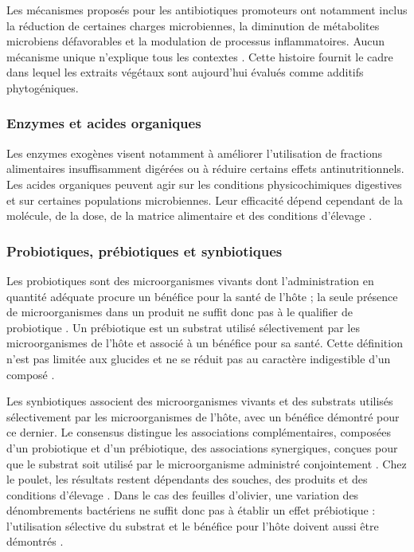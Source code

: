 Les mécanismes proposés pour les antibiotiques promoteurs ont notamment inclus la réduction de certaines charges microbiennes, la diminution de métabolites microbiens défavorables et la modulation de processus inflammatoires. Aucun mécanisme unique n'explique tous les contextes \citep{Gadde2017}. Cette histoire fournit le cadre dans lequel les extraits végétaux sont aujourd'hui évalués comme additifs phytogéniques.

\subsubsection{Enzymes et acides organiques}

Les enzymes exogènes visent notamment à améliorer l'utilisation de fractions alimentaires insuffisamment digérées ou à réduire certains effets antinutritionnels. Les acides organiques peuvent agir sur les conditions physicochimiques digestives et sur certaines populations microbiennes. Leur efficacité dépend cependant de la molécule, de la dose, de la matrice alimentaire et des conditions d'élevage \citep{Gadde2017}.

\subsubsection{Probiotiques, prébiotiques et synbiotiques}

Les probiotiques sont des microorganismes vivants dont l'administration en quantité adéquate procure un bénéfice pour la santé de l'hôte ; la seule présence de microorganismes dans un produit ne suffit donc pas à le qualifier de probiotique \citep{Hill2014}. Un prébiotique est un substrat utilisé sélectivement par les microorganismes de l'hôte et associé à un bénéfice pour sa santé. Cette définition n'est pas limitée aux glucides et ne se réduit pas au caractère indigestible d'un composé \citep{Gibson2017}.

Les synbiotiques associent des microorganismes vivants et des substrats utilisés sélectivement par les microorganismes de l'hôte, avec un bénéfice démontré pour ce dernier. Le consensus distingue les associations complémentaires, composées d'un probiotique et d'un prébiotique, des associations synergiques, conçues pour que le substrat soit utilisé par le microorganisme administré conjointement \citep{Swanson2020}. Chez le poulet, les résultats restent dépendants des souches, des produits et des conditions d'élevage \citep{Gadde2017}. Dans le cas des feuilles d'olivier, une variation des dénombrements bactériens ne suffit donc pas à établir un effet prébiotique : l'utilisation sélective du substrat et le bénéfice pour l'hôte doivent aussi être démontrés \citep{Gibson2017}.

